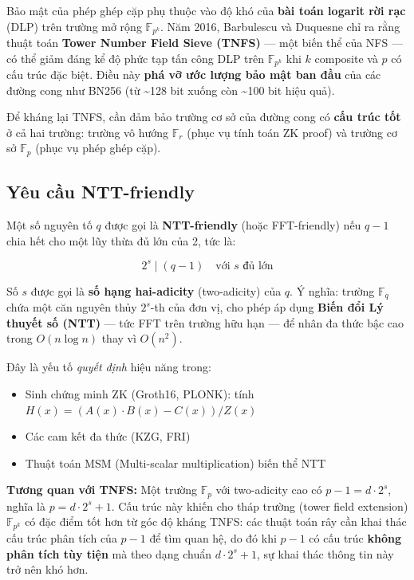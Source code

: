 Bảo mật của phép ghép cặp phụ thuộc vào độ khó của \textbf{bài toán
logarit rời rạc} (DLP) trên trường mở rộng \(\mathbb{F}_{p^k}\). Năm
2016, Barbulescu và Duquesne \citep{BarbulescuDuquesne2019} chỉ ra rằng
thuật toán \textbf{Tower Number Field Sieve (TNFS)} --- một biến thể của
NFS --- có thể giảm đáng kể độ phức tạp tấn công DLP trên
\(\mathbb{F}_{p^k}\) khi \(k\) composite và \(p\) có cấu trúc đặc biệt.
Điều này \textbf{phá vỡ ước lượng bảo mật ban đầu} của các đường cong
như BN256 (từ \textasciitilde128 bit xuống còn \textasciitilde100 bit
hiệu quả).

Để kháng lại TNFS, cần đảm bảo trường cơ sở của đường cong có
\textbf{cấu trúc tốt} ở cả hai trường: trường vô hướng \(\mathbb{F}_r\)
(phục vụ tính toán ZK proof) và trường cơ sở \(\mathbb{F}_p\) (phục vụ
phép ghép cặp).

\subsection{Yêu cầu NTT-friendly}\label{yuxeau-cux1ea7u-ntt-friendly}

Một số nguyên tố \(q\) được gọi là \textbf{NTT-friendly} (hoặc
FFT-friendly) nếu \(q - 1\) chia hết cho một lũy thừa đủ lớn của 2, tức
là:

\[2^s \mid (q - 1) \quad \text{với } s \text{ đủ lớn}\]

Số \(s\) được gọi là \textbf{số hạng hai-adicity} (two-adicity) của
\(q\). Ý nghĩa: trường \(\mathbb{F}_q\) chứa một căn nguyên thủy
\(2^s\)-th của đơn vị, cho phép áp dụng \textbf{Biến đổi Lý thuyết số
(NTT)} --- tức FFT trên trường hữu hạn --- để nhân đa thức bậc cao trong
\(O(n \log n)\) thay vì \(O(n^2)\).

Đây là yếu tố \emph{quyết định} hiệu năng trong:

\begin{itemize}
\tightlist
\item
  Sinh chứng minh ZK (Groth16, PLONK): tính
  \(H(x) = (A(x) \cdot B(x) - C(x)) / Z(x)\)
\item
  Các cam kết đa thức (KZG, FRI)
\item
  Thuật toán MSM (Multi-scalar multiplication) biến thể NTT
\end{itemize}

\textbf{Tương quan với TNFS:} Một trường \(\mathbb{F}_p\) với
two-adicity cao có \(p-1 = d \cdot 2^s\), nghĩa là
\(p = d \cdot 2^s + 1\). Cấu trúc này khiến cho tháp trường (tower field
extension) \(\mathbb{F}_{p^k}\) có đặc điểm tốt hơn từ góc độ kháng
TNFS: các thuật toán rây cần khai thác cấu trúc phân tích của \(p-1\) để
tìm quan hệ, do đó khi \(p-1\) có cấu trúc \textbf{không phân tích tùy
tiện} mà theo dạng chuẩn \(d \cdot 2^s + 1\), sự khai thác thông tin này
trở nên khó hơn.


